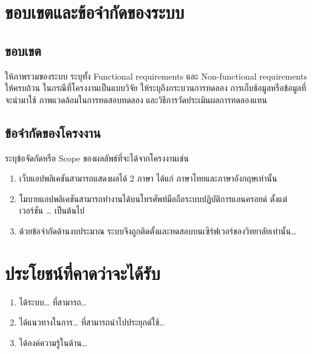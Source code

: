 



\section{ขอบเขตและข้อจำกัดของระบบ}

\subsection{ขอบเขต}

ให้ภาพรวมของระบบ ระบุทั้ง Functional requirements และ Non-functional requirements ให้ครบถ้วน ในกรณีที่โครงงานเป็นแบบวิจัย ให้ระบุถึงกระบวนการทดลอง การเก็บช้อมูลหรือข้อมูลที่จะนำมาใช้ ภาพแวดล้อมในการทดสอบทดลอง และวิธีการวัดประเมินผลการทดลองแทน

\subsection{ข้อจำกัดของโครงงาน}
ระบุข้อจัดกัดหรือ Scope ของผลลัพธ์ที่จะได้จากโครงงานเช่น 
\begin{enumerate}[label=\arabic*)]
    \item เว็บแอปพลิเคชันสามารถแสดงผลได้ 2 ภาษา ได้แก่ ภาษาไทยและภาษาอังกฤษเท่านั้น
    \item โมบายแอปพลิเคชันสามารถทำงานได้บนโทรศัพท์มือถือระบบปฏิบัติการแอนครอยด์ ตั้งแต่เวอร์ชัน \ldots{} เป็นต้นไป
    \item ด้วยข้อจำกัดด้านงบประมาณ ระบบจึงถูกติดตั้งและทดสอบบนเซิร์ฟเวอร์ของวิทยาลัยเท่านั้น\ldots{}
\end{enumerate}

\section{ประโยชน์ที่คาดว่าจะได้รับ}

\begin{enumerate}[label=\arabic*)]
    \item ได้ระบบ\ldots{} ที่สามารถ\ldots{}
    \item ได้แนวทางในการ\ldots{} ที่สามารถนำไปประยุกต์ใช้\ldots{}
    \item ได้องค์ความรู้ในด้าน\ldots{}
\end{enumerate}
